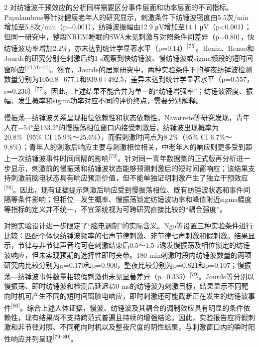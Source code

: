 \documentclass[UTF8,zihao=5,fontset=none]{ctexart}
\newcommand{\hei}{\CJKfamily{hei}}
\newcommand{\leveltwo}[1]{%
  \par\noindent{\hei\fontsize{10pt}{12pt}\selectfont\bfseries #1\par}}
\newcommand{\refcite}[1]{\nolinebreak[4]\textsuperscript{[#1]}}
\begin{document}
\begin{multicols}{2}
对纺锤波干预效应的分析同样需要区分事件层面和功率层面的不同指标。Papalambros等针对健康老年人的研究显示，刺激条件下纺锤波密度由5.5次/min增加至5.8次/min（p=0.001），纺锤波振幅由12.9 μV增加至14.1 μV（p<0.001）；但同一研究中，整段NREM睡眠的SWA未见刺激与对照条件间差异（p=0.80），快纺锤波功率增加2.2\%，亦未达到统计学显著水平（p=0.14）\refcite{75}。Henin、Henao和Jourde的研究分别在刺激后约1 s观察到快纺锤波、慢纺锤波或sigma频段的短时间窗响应\refcite{74,76--77}。然而，Jourde的居家研究中，两种实验条件下的整夜纺锤波检测数量分别为1050.8$\pm$677.1和939.0$\pm$492.5，差异未达到统计学显著水平（p=0.557，r=0.236）\refcite{77}。因此，上述结果不能合并为单一的“纺锤增强率”；纺锤波密度、振幅、发生概率和sigma功率对应不同的评价终点，需要分别解释。\par

慢振荡—纺锤波关系呈现相位依赖性和状态依赖性。Navarrete等研究发现，青年人在−54°至133.2°的慢振荡相位窗口内接受刺激后，纺锤波出现概率为20.8\%（95\% CI 15.9\%～25.6\%），而假刺激时间点为8.2\%（95\% CI 6.7\%～9.8\%）；青年人的刺激后响应主要与刺激相位相关，中老年人的响应则更多受到距上一次纺锤波事件时间间隔的影响\refcite{72}。针对同一青年数据集的正式版再分析进一步显示，刺激前的慢振荡和纺锤波状态能够预测刺激后的短时间窗响应；该结果支持刺激前脑电状态具有响应预测价值，但不能单独证明刺激产生了独立干预效应\refcite{78}。因此，现有证据提示刺激后响应受到慢振荡相位、既有纺锤波状态和事件间隔等条件影响；但相位—发生概率、慢振荡锁定纺锤波功率和峰值附近sigma幅度等指标的定义并不统一，不宜笼统视为可跨研究直接比较的“耦合强度”。\par

对照实验设计进一步限定了“脑电调制”的实际含义。Ngo等设置三种实验条件进行比较：匹配个体快纺锤波频率的七声节律刺激、非节律七声刺激和假刺激。结果显示，节律与非节律声音均可在刺激结束后0.5～1.5 s诱发慢振荡及相位锁定的纺锤波响应，但未实现预期的选择性即时夹带。180 min刺激时段内纺锤波数量的两项研究内比较分别为p=0.170和p=0.900，整夜比较分别为p=0.821和p=0.107；慢振荡—纺锤波事件数量相较假刺激也未见显著差异（p=0.335）\refcite{79}。Jourde等分别以慢振荡、即时纺锤波和检测后延迟450 ms的纺锤波为刺激目标，结果显示不同靶向时机可产生不同的短时间窗脑电响应，即时刺激还可能截断正在发生的纺锤波事件\refcite{80}。综合上述人体证据，慢波、纺锤波及其耦合的调制效应具有明显的条件依赖性，现有结果尚不支持跨范式普遍且持续的增强结论。因此，实验报告应将假刺激和非节律对照、不同靶向时机以及整夜尺度的阴性结果，与刺激窗口内的瞬时阳性响应并列呈现\refcite{79--80}。\par

\leveltwo{3.3 记忆巩固与认知收益的疗效证据及争议}


\end{multicols}
\end{document}
